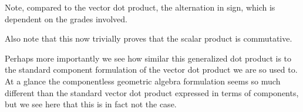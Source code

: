 Note, compared to the vector dot product, the alternation in sign, which is
dependent on the grades involved.

Also note that this now trivially proves that the scalar product is commutative.

Perhaps more importantly we see how similar this generalized dot product is to the
standard component formulation of the vector dot product we are so used to.
At a glance the componentless geometric algebra formulation seems
so much different than the standard vector dot product expressed in terms of components, but
we see here that this is in fact not the case.

